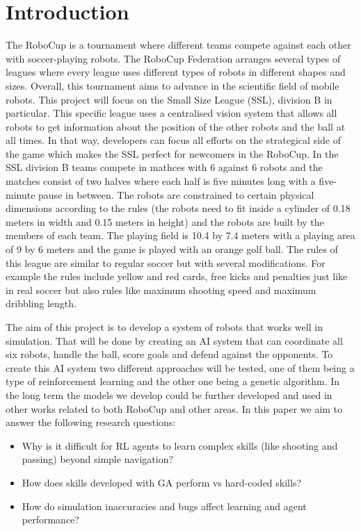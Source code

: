 \section{Introduction}
\label{section:intro}

The RoboCup is a tournament where different teams 
compete against each other with soccer-playing robots. The RoboCup 
Federation arranges several types of leagues where every league uses 
different types of robots in different shapes and sizes. Overall, this 
tournament aims to advance in the scientific field of mobile robots. 
This project will focus on the Small Size League (SSL), division B in 
particular. This specific league uses a centralised vision system that 
allows all robots to get information about the position of the 
other robots and the ball at all times. In that way, developers can focus 
all efforts on the strategical side of the game which makes the SSL 
perfect for newcomers in the RoboCup. In the SSL division B teams 
compete in mathces with 6 against 6 robots and the matches consist of 
two halves where each half is five minutes long with a five-minute pause 
in between. The robots are constrained to certain physical dimensions 
according to the rules (the robots need to fit inside a cylinder of 
0.18 meters in width and 0.15 meters in height) and the robots are built 
by the members of each team. The playing field is 10.4 by 7.4 meters 
with a playing area of 9 by 6 meters and the game is played with an 
orange golf ball. The rules of this league are similar to regular soccer 
but with several modifications. For example the rules include yellow 
and red cards, free kicks and penalties just like in real soccer but 
also rules like maximum shooting speed and maximum dribbling length\cite{RoboCupSSL}. 

The aim of this project is to develop a system of robots that works well in 
simulation. That will be done by creating an AI system that can 
coordinate all six robots, handle the ball, score goals and defend 
against the opponents. To create this AI system two different approaches 
will be tested, one of them being a type of reinforcement learning and the 
other one being a genetic algorithm. In the long term the models we develop could 
be further developed and used in other works related to both RoboCup 
and other areas. In this paper we aim to answer the following research questions:

\begin{itemize}
        \item Why is it difficult for RL agents to learn complex skills (like shooting and passing) beyond simple navigation?
        \item How does skills developed with GA perform vs hard-coded skills?
        \item How do simulation inaccuracies and bugs affect learning and agent performance? 
\end{itemize}
